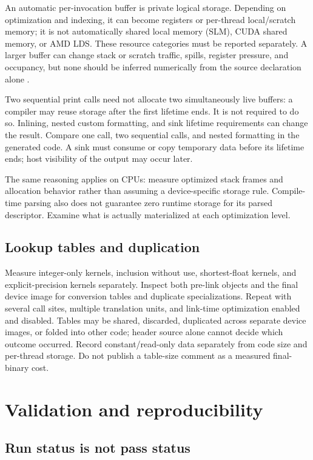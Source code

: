 \documentclass[11pt,letterpaper]{article}
\begin{document}
An automatic per-invocation buffer is private logical storage. Depending on
optimization and indexing, it can become registers or per-thread local/scratch
memory; it is not automatically shared local memory (SLM), CUDA shared memory,
or AMD LDS. These resource categories must be reported separately. A larger
buffer can change stack or scratch traffic, spills, register pressure, and
occupancy, but none should be inferred numerically from the source declaration
alone \cite{cuda-memory,amdgpu-usage}.

Two sequential print calls need not allocate two simultaneously live buffers:
a compiler may reuse storage after the first lifetime ends. It is not required
to do so. Inlining, nested custom formatting, and sink lifetime requirements
can change the result. Compare one call, two sequential calls, and nested
formatting in the generated code. A sink must consume or copy temporary data
before its lifetime ends; host visibility of the output may occur later.

The same reasoning applies on CPUs: measure optimized stack frames and
allocation behavior rather than assuming a device-specific storage rule.
Compile-time parsing also does not guarantee zero runtime storage for its
parsed descriptor. Examine what is actually materialized at each optimization
level.

\subsection{Lookup tables and duplication}

Measure integer-only kernels, inclusion without use, shortest-float kernels,
and explicit-precision kernels separately. Inspect both pre-link objects and
the final device image for conversion tables and duplicate specializations.
Repeat with several call sites, multiple translation units, and link-time
optimization enabled and disabled. Tables may be shared, discarded, duplicated
across separate device images, or folded into other code; header source alone
cannot decide which outcome occurred. Record constant/read-only data separately
from code size and per-thread storage. Do not publish a table-size comment as
a measured final-binary cost.

\section{Validation and reproducibility}

\subsection{Run status is not pass status}
\end{document}
